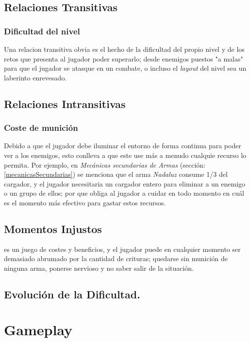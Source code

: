     \subsection{Relaciones Transitivas}
        \subsubsection{Dificultad del nivel}
            Una relacion transitiva obvia es el hecho de la dificultad del propio nivel y de los retos que presenta al jugador poder superarlo; desde enemigos puestos "a malas" para que el jugador se atasque en un combate, o incluso el \textit{layout} del nivel sea un laberinto enrevesado.

    \subsection{Relaciones Intransitivas}
        \subsubsection{Coste de munición}
        Debido a que el jugador debe iluminar el entorno de forma continua para poder ver a los enemigos, esto conlleva a que este use más a menudo cualquie recurso lo permita. Por ejemplo, en \textit{Mecánicas secundarias de Armas} (sección: \ref{mecanicasSecundarias}) se menciona que el arma \textit{Nadaluz} consume 1/3 del cargador, y el jugador necesitaria un cargador entero para eliminar a un enemigo o un grupo de ellos; por que obliga al jugador a cuidar en todo momento en cuál es el momento más efectivo para gastar estos recursos.
    \subsection{Momentos Injustos}
        \TWD es un juego de costes y beneficios, y el jugador puede en cualquier momento ser demasiado abrumado por la cantidad de crituras; quedarse sin munición de ninguna arma, ponerse nervioso y no saber salir de la situación.
    \subsection{Evolución de la Dificultad.}

\section{Gameplay}
